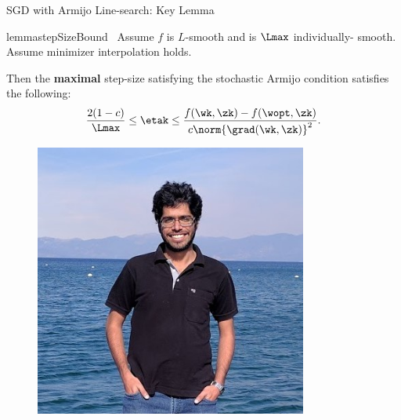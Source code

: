\documentclass[mathserif,notheorems, hyperref={colorlinks, citecolor=blue, urlcolor=blue, linkcolor=blue}]{beamer}
\def\\{}%
\begin{document}
    \begin{frame}{SGD with Armijo Line-search: Key Lemma}
        \vspace{-2ex}
        \begin{minipage}[t]{0.82\textwidth}
        \vspace{-1.45ex} 
            \begin{restatable}{lemma}{stepSizeBound}~\label{lemma:step-size-bound}
                Assume \( f \) is \( L \)-smooth and \oracle{} is \( \Lmax \) individually- smooth.
                Assume minimizer interpolation holds.\\

                Then the \textbf{maximal} step-size satisfying the stochastic Armijo condition satisfies the following: 
                \[ \frac{2 (1-c)}{\Lmax} \leq \etak \leq \frac{f(\wk, \zk) - f(\wopt, \zk)}{c \norm{\grad(\wk, \zk)}^2}. \]
            \end{restatable}
       \end{minipage} 
       \begin{minipage}[t]{0.15\textwidth}
            \begin{figure}[t]
                \centering
                \includegraphics[width=0.8\textwidth]{collaborators/sharan}


\end{figure}
\end{minipage}
\end{frame}
\end{document}
